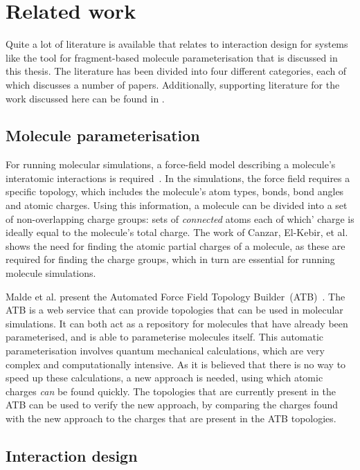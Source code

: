 \chapter{Related work}

Quite a lot of literature is available that relates to interaction design for systems like the tool for fragment-based molecule parameterisation that is discussed in this thesis. The literature has been divided into four different categories, each of which discusses a number of papers. Additionally, supporting literature for the work discussed here can be found in .


\section{Molecule parameterisation}
For running molecular simulations, a force-field model describing a molecule's interatomic interactions is required~\cite{canzar2012charge}. In the simulations, the force field requires a specific topology, which includes the molecule's atom types, bonds, bond angles and atomic charges. Using this information, a molecule can be divided into a set of non-overlapping charge groups: sets of \emph{connected} atoms each of which' charge is ideally equal to the molecule's total charge. The work of Canzar, El-Kebir, et al. shows the need for finding the atomic partial charges of a molecule, as these are required for finding the charge groups, which in turn are essential for running molecule simulations.

Malde et al. present the Automated Force Field Topology Builder~(ATB)~\cite{malde2011automated}. The ATB is a web service that can provide topologies that can be used in molecular simulations. It can both act as a repository for molecules that have already been parameterised, and is able to parameterise molecules itself. This automatic parameterisation involves quantum mechanical calculations, which are very complex and computationally intensive. As it is believed that there is no way to speed up these calculations, a new approach is needed, using which atomic charges \emph{can} be found quickly. The topologies that are currently present in the ATB can be used to verify the new approach, by comparing the charges found with the new approach to the charges that are present in the ATB topologies.


\section{Interaction design}

